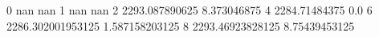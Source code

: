 0 nan nan
1 nan nan
2 2293.087890625 8.373046875
4 2284.71484375 0.0
6 2286.302001953125 1.587158203125
8 2293.46923828125 8.75439453125
